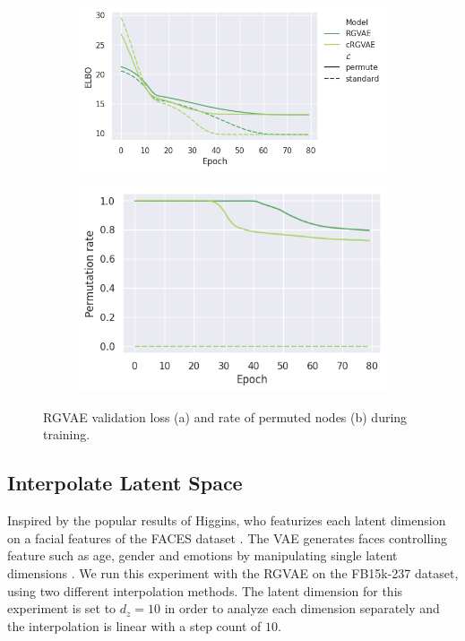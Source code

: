 \begin{figure}
  \right
  \begin{subfigure}{.55\textwidth}
    \left
    \includegraphics[height=.5\textwidth, keepaspectratio]{graphs/plots/permute_loss.png}
    \label{fig5:permELBO}
  \end{subfigure}%
  \begin{subfigure}{.55\textwidth}
    \left
    \includegraphics[height=.5\textwidth]{graphs/plots/permute_permutation_wol.png}
    \label{fig5:permRate}
  \end{subfigure}
  \caption{RGVAE validation loss (a) and rate of permuted nodes (b) during training.}
  \label{fig5:permInv}
\end{figure}

\subsection{Interpolate Latent Space}

Inspired by the popular results of Higgins, who featurizes each latent dimension on a facial features of the FACES dataset \cite{ebner_facesdatabase_2010}. The VAE generates faces controlling feature such as age, gender and emotions by manipulating single latent dimensions \cite{higgins_beta-vae_2016}.  We run this experiment with the RGVAE on the FB15k-237 dataset, using two different interpolation methods. The latent dimension for this experiment is set to $d_{z}=10$ in order to analyze each dimension separately and the interpolation is linear with a step count of $10$.

